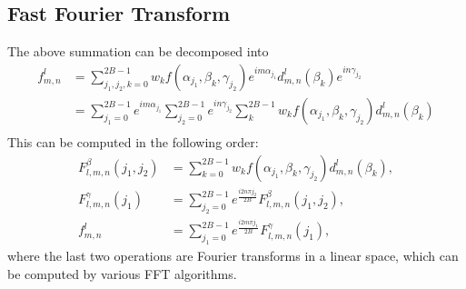 \documentclass[onecolumn,11pt]{IEEEtran}
\begin{document}
\subsection{Fast Fourier Transform}
The above summation can be decomposed into
\begin{align*}
f^l_{m,n}&=\sum_{j_1,j_2,k=0}^{2B-1} w_k f(\alpha_{j_1},\beta_k,\gamma_{j_2})
e^{im\alpha_{j_1}} d^l_{m,n}(\beta_k) e^{in\gamma_{j_2}}\\
&=\sum_{j_1=0}^{2B-1} 
e^{im\alpha_{j_1}}\sum_{j_2=0}^{2B-1} e^{in\gamma_{j_2}} \sum_{k}^{2B-1}w_k f(\alpha_{j_1},\beta_k,\gamma_{j_2})d^l_{m,n}(\beta_k) \\
\end{align*}
This can be computed in the following order:
\begin{align*}
F^{\beta}_{l,m,n}(j_1,j_2)&=\sum_{k=0}^{2B-1}w_k f(\alpha_{j_1},\beta_k,\gamma_{j_2})d^l_{m,n}(\beta_k),\\
F^{\gamma}_{l,m,n}(j_1)&=\sum_{j_2=0}^{2B-1}e^{\frac{i 2 n \pi j_2}{2B}}F^{\beta}_{l,m,n}(j_1,j_2),\\
f^l_{m,n} & = \sum_{j_1=0}^{2B-1} e^{\frac{i 2 m\pi j_1}{2B}}F^{\gamma}_{l,m,n}(j_1),
\end{align*}
where the last two operations are Fourier transforms in a linear space, which can be computed by various FFT algorithms. 

%
\end{document}
